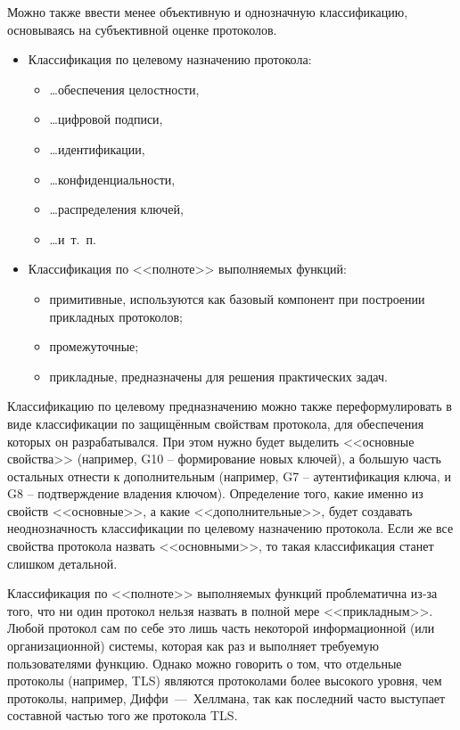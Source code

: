 Можно также ввести менее объективную и однозначную классификацию, основываясь на субъективной оценке протоколов.
\begin{itemize}
    \item Классификация по целевому назначению протокола:
    \begin{itemize}
        \item \dots обеспечения целостности, 
        \item \dots цифровой подписи, 
        \item \dots идентификации, 
        \item \dots конфиденциальности, 
        \item \dots распределения ключей, 
        \item \dots и~т.~п.
    \end{itemize}
    \item Классификация по <<полноте>> выполняемых функций:
    \begin{itemize}
        \item примитивные, используются как базовый компонент при построении прикладных протоколов;
        \item промежуточные;
        \item прикладные, предназначены для решения практических задач.
    \end{itemize}
\end{itemize}

Классификацию по целевому предназначению можно также переформулировать в виде классификации по защищённым свойствам протокола, для обеспечения которых он разрабатывался. При этом нужно будет выделить <<основные свойства>> (например, G10 -- формирование новых ключей), а большую часть остальных отнести к дополнительным (например, G7 -- аутентификация ключа, и G8 -- подтверждение владения ключом). Определение того, какие именно из свойств <<основные>>, а какие <<дополнительные>>, будет создавать неоднозначность классификации по целевому назначению протокола. Если же все свойства протокола назвать <<основными>>, то такая классификация станет слишком детальной.

Классификация по <<полноте>> выполняемых функций проблематична из-за того, что ни один протокол нельзя назвать в полной мере <<прикладным>>. Любой протокол сам по себе это лишь часть некоторой информационной (или организационной) системы, которая как раз и выполняет требуемую пользователями функцию. Однако можно говорить о том, что отдельные протоколы (например, TLS) являются протоколами более высокого уровня, чем протоколы, например, Диффи~---~Хеллмана, так как последний часто выступает составной частью того же протокола TLS.
